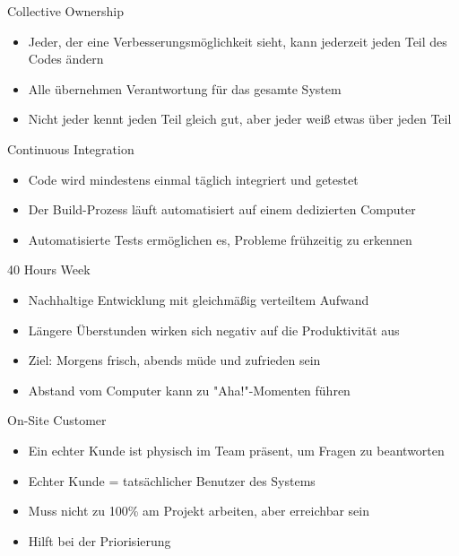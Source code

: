 \begin{concept}{Collective Ownership}\\
    \begin{itemize}
        \item Jeder, der eine Verbesserungsmöglichkeit sieht, kann jederzeit jeden Teil des Codes ändern
        \item Alle übernehmen Verantwortung für das gesamte System
        \item Nicht jeder kennt jeden Teil gleich gut, aber jeder weiß etwas über jeden Teil
    \end{itemize}
\end{concept}

\begin{concept}{Continuous Integration}\\
    \begin{itemize}
        \item Code wird mindestens einmal täglich integriert und getestet
        \item Der Build-Prozess läuft automatisiert auf einem dedizierten Computer
        \item Automatisierte Tests ermöglichen es, Probleme frühzeitig zu erkennen
    \end{itemize}
\end{concept}

\begin{concept}{40 Hours Week}\\
    \begin{itemize}
        \item Nachhaltige Entwicklung mit gleichmäßig verteiltem Aufwand
        \item Längere Überstunden wirken sich negativ auf die Produktivität aus
        \item Ziel: Morgens frisch, abends müde und zufrieden sein
        \item Abstand vom Computer kann zu "Aha!"-Momenten führen
    \end{itemize}
\end{concept}

\begin{concept}{On-Site Customer}\\
    \begin{itemize}
        \item Ein echter Kunde ist physisch im Team präsent, um Fragen zu beantworten
        \item Echter Kunde = tatsächlicher Benutzer des Systems
        \item Muss nicht zu 100\% am Projekt arbeiten, aber erreichbar sein
        \item Hilft bei der Priorisierung
    \end{itemize}
\end{concept}

